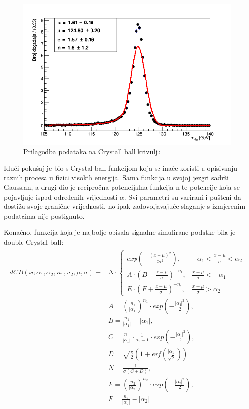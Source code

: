 \documentclass[12pt,a4paper,oneside]{article}
\begin{document}
\begin{linenumbers}
		\begin{figure}[H]
			\centering
			\includegraphics[width=1.0\textwidth]{CBFit-23-7-final-weight.png}
			\caption[Saturn viđen u ultraljubičastom svjetlu.]{\label{sl:cbfit} Prilagodba podataka na Crystall ball krivulju}
		\end{figure}
		Idući pokušaj je bio s Crystal ball funkcijom koja se inače koristi u opisivanju raznih procesa u fizici visokih energija. Sama funkcija u svojoj jezgri sadrži Gaussian, a drugi dio je recipročna potencijalna funkcija n-te potencije koja se pojavljuje ispod određenih vrijednosti $\alpha$. Svi parametri su varirani i pušteni da dostižu svoje granične vrijednosti, no ipak zadovoljavajuće slaganje s izmjerenim podatcima nije postignuto.
		
		Konačno, funkcija koja je najbolje opisala signalne simulirane podatke bila je double Crystal ball:
		\begin{align}
		\begin{split}
		dCB(x; \alpha_1, \alpha_2, n_1, n_2, \mu, \sigma)={}& N \cdot \begin{cases}
		exp(- \frac{(x-\mu)^2}{2\sigma^2}),& -\alpha_1 <\frac{x-\mu}{\sigma}< \alpha_2\\
		A \cdot (B- \frac{x-\mu}{\sigma})^{-n_1},& \frac{x-\mu}{\sigma} < - \alpha_1\\
		E \cdot (F + \frac{x-\mu}{\sigma})^{-n_2},& \frac{x-\mu}{\sigma} >  \alpha_2
		\end{cases}\\
		&A = (\frac{n_1}{|\alpha_1|})^{n_1} \cdot exp(- \frac{|\alpha_1|^2}{2}), \\
		&B = \frac{n_1}{|\alpha_1|} - |\alpha_1|, \\
		&C = \frac{n_1}{|\alpha_1|} \cdot \frac{1}{n_1 - 1} \cdot exp(- \frac{|\alpha_1|^2}{2}), \\
		&D = \sqrt{\frac{\pi}{2}} (1+erf(\frac{|\alpha_1|}{\sqrt{2}})) \\
		&N = \frac{1}{\sigma (C+D)}, \\
		&E = (\frac{n_2}{|\alpha_2|})^{n_2} \cdot exp(- \frac{|\alpha_2|^2}{2}), \\
		&F = \frac{n_2}{|\alpha_2|} - |\alpha_2|
		\end{split}
		\end{align}
		

\end{linenumbers}
\end{document}
